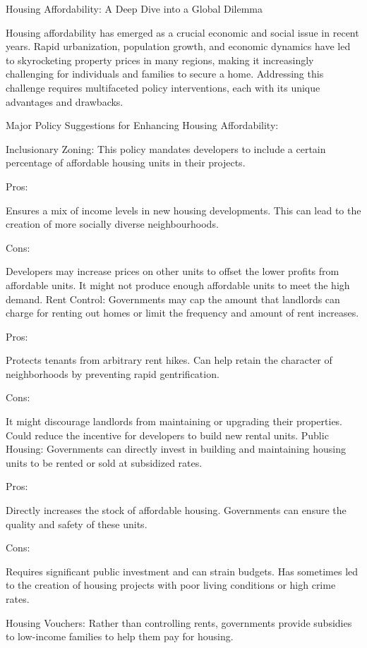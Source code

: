 Housing Affordability: A Deep Dive into a Global Dilemma

Housing affordability has emerged as a crucial economic and social issue in recent years. Rapid urbanization, population growth, and economic dynamics have led to skyrocketing property prices in many regions, making it increasingly challenging for individuals and families to secure a home. Addressing this challenge requires multifaceted policy interventions, each with its unique advantages and drawbacks.

Major Policy Suggestions for Enhancing Housing Affordability:

Inclusionary Zoning: This policy mandates developers to include a certain percentage of affordable housing units in their projects.

Pros:

Ensures a mix of income levels in new housing developments.
This can lead to the creation of more socially diverse neighbourhoods.

Cons:

Developers may increase prices on other units to offset the lower profits from affordable units.
It might not produce enough affordable units to meet the high demand.
Rent Control: Governments may cap the amount that landlords can charge for renting out homes or limit the frequency and amount of rent increases.

Pros:

Protects tenants from arbitrary rent hikes.
Can help retain the character of neighborhoods by preventing rapid gentrification.

Cons:

It might discourage landlords from maintaining or upgrading their properties.
Could reduce the incentive for developers to build new rental units.
Public Housing: Governments can directly invest in building and maintaining housing units to be rented or sold at subsidized rates.

Pros:

Directly increases the stock of affordable housing.
Governments can ensure the quality and safety of these units.

Cons:

Requires significant public investment and can strain budgets.
Has sometimes led to the creation of housing projects with poor living conditions or high crime rates.

Housing Vouchers: Rather than controlling rents, governments provide subsidies to low-income families to help them pay for housing.


